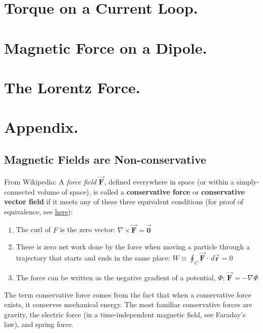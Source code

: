 \documentclass[11pt, letterpaper]{article}
\theoremstyle{definition}
\theoremstyle{remark}
\newcommand{\bv}[2][]{\bm{\vec{#2}_{#1}}}
\begin{document}
\section{Torque on a Current Loop.}
\section{Magnetic Force on a Dipole.}
\section{The Lorentz Force.}

\section{Appendix.}
\subsection{Magnetic Fields are Non-conservative}
\label{subsec:non-conservative}
From Wikipedia: A \textit{force field} $\bv{F}$, defined everywhere in space (or within a simply-connected volume of space), is called a \textbf{conservative force} or \textbf{conservative vector field} if it meets any of these three equivalent conditions (for proof of equivalence, see \href{https://en.wikipedia.org/wiki/Conservative_force#Mathematical_description}{here}):
\begin{enumerate}
	\item The curl of $F$ is the zero vector: $\nabla\times\bv{F} = \bv{0}$
	\item There is zero net work done by the force when moving a particle through a trajectory that starts and ends in the same place: $W \equiv \oint_C \bv{F}\cdot\, d\bv{r} = 0$
	\item The force can be written as the negative gradient of a potential, $\Phi$: $\bv{F} = -\nabla\Phi$
\end{enumerate}
The term conservative force comes from the fact that when a conservative force exists, it conserves mechanical energy. The most familiar conservative forces are gravity, the electric force (in a time-independent magnetic field, see Faraday's law), and spring force.
\end{document}
